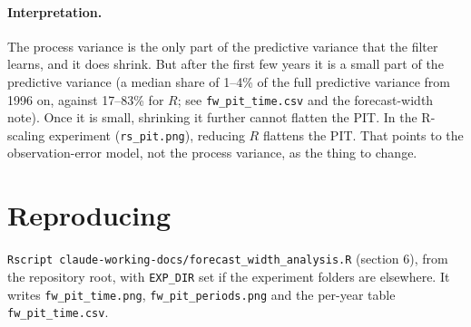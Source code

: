 \documentclass[11pt]{article}
\newcommand{\code}[1]{\texttt{#1}}
\begin{document}
\paragraph{Interpretation.}
The process variance is the only part of the predictive variance that the filter learns,
and it does shrink. But after the first few years it is a small part of the predictive
variance (a median share of 1--4\% of the full predictive variance from 1996 on, against 17--83\% for $R$;
see \code{fw\_pit\_time.csv} and the forecast-width note). Once it is small, shrinking it further
cannot flatten the PIT. In the R-scaling experiment (\code{rs\_pit.png}), reducing $R$
flattens the PIT. That points to the observation-error model, not the process variance, as
the thing to change.

\section*{Reproducing}

\code{Rscript claude-working-docs/forecast\_width\_analysis.R} (section 6), from the
repository root, with \code{EXP\_DIR} set if the experiment folders are elsewhere. It writes
\code{fw\_pit\_time.png}, \code{fw\_pit\_periods.png} and the per-year table
\code{fw\_pit\_time.csv}.
\end{document}
